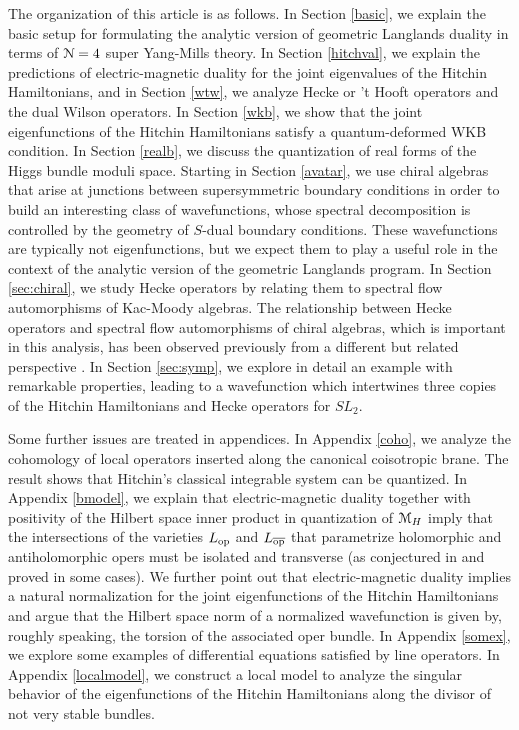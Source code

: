\documentclass[11pt,a4paper]{article}
\begin{document}
The organization of this article is as follows.   In Section \ref{basic}, we explain the basic setup for formulating the analytic version of geometric Langlands
duality in terms of ${\mathcal N}=4$ super Yang-Mills theory.    In Section \ref{hitchval}, we explain the predictions of electric-magnetic duality for the joint eigenvalues of the
Hitchin Hamiltonians, and in Section \ref{wtw}, we analyze Hecke or 't Hooft operators and the dual Wilson operators.  In Section \ref{wkb}, we show that the
joint eigenfunctions of the Hitchin Hamiltonians satisfy a quantum-deformed WKB condition.   In Section \ref{realb}, we discuss the quantization of real forms
of the Higgs bundle moduli space.    
Starting in Section \ref{avatar}, 
we use chiral algebras that arise at junctions between supersymmetric boundary conditions in order to build an interesting class of wavefunctions,
whose spectral decomposition is controlled by the geometry of $S$-dual boundary conditions. These wavefunctions are typically not eigenfunctions, 
but we expect them to play a useful role 
in the context of the analytic version of the geometric Langlands program. 
In Section \ref{sec:chiral}, we study Hecke operators by relating them to spectral flow automorphisms of Kac-Moody algebras.   The relationship between Hecke operators
and spectral flow automorphisms of chiral algebras, which is important in this analysis,
has been observed previously from a different but related perspective \cite{Teschner:2010je}.
 In Section \ref{sec:symp}, we explore in detail an example with remarkable properties, leading to a wavefunction which intertwines three copies of the Hitchin Hamiltonians and Hecke operators for $SL_2$.




Some further issues are treated in appendices. In Appendix \ref{coho}, we analyze the cohomology of local operators inserted along the canonical coisotropic
brane.   The result shows that Hitchin's classical integrable system can be quantized.    In Appendix \ref{bmodel}, we explain that electric-magnetic duality together with positivity of the Hilbert space
inner product in quantization of ${\mathcal M}_H$ imply that the intersections of the varieties $L_{\mathrm{op}}$ and $L_{\overline{\mathrm{op}}}$ that parametrize holomorphic and antiholomorphic
opers must be isolated and transverse (as conjectured in \cite{EFK} and proved in some cases).    We further point out that electric-magnetic duality implies
a natural normalization for the joint eigenfunctions of the Hitchin Hamiltonians and argue that the Hilbert space norm of a normalized wavefunction is given
by, roughly speaking, the torsion of the associated oper bundle.  In Appendix \ref{somex}, we explore some examples of differential equations satisfied by line
operators.   In Appendix \ref{localmodel}, we construct a local model to analyze the singular behavior of the eigenfunctions of the Hitchin Hamiltonians
along the divisor of not very stable bundles.  
\end{document}
